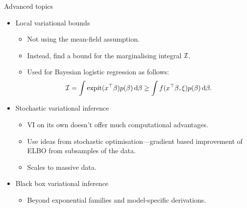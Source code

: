 \begin{frame}{Advanced topics}
  \begin{itemize}
    \item<1-> Local variational bounds 
    \begin{itemize}
      \item Not using the mean-field assumption.
      \item Instead, find a bound for the marginalising integral ${\mathcal I}$.
      \item Used for Bayesian logistic regression as follows:
      \[
        {\mathcal I} = \int \operatorname{expit}(x^\top\beta) p(\beta) \, \text{d}\beta \geq \int f(x^\top\beta,\xi) p(\beta) \, \text{d}\beta.
      \]
    \end{itemize}
    \item<2-> Stochastic variational inference
    \begin{itemize}
      \item VI on its own doesn't offer much computational advantages.
      \item Use ideas from stochastic optimisation---gradient based improvement of ELBO from subsamples of the data.
      \item Scales to massive data.
    \end{itemize}
    \item<3-> Black box variational inference
    \begin{itemize}
      \item Beyond exponential families and model-specific derivations.
    \end{itemize}
  \end{itemize}
\end{frame}
